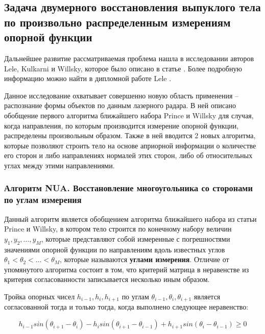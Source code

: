 \documentclass[a4paper, 12pt, titlepage]{article}
\theoremstyle{definition}
\theoremstyle{plain}
\theoremstyle{plain}
\begin{document}
\newpage
\subsection{Задача двумерного восстановления выпуклого тела по произвольно
распределенным измерениям опорной функции}
\label{sec:support-methods:2d-nonuniform}

Дальнейшее развитие рассматриваемая проблема нашла в исследовании авторов Lele,
Kulkarni и Willsky, которое было описано в статье
\cite{journals/josaa/LeleKW92}. Более подробную информацию можно найти в
дипломной работе Lele \cite{thesis/Lele90}.

Данное исследование охватывает совершенно новую область применения --
распознание формы объектов по данным лазерного радара. В ней описано обобщение
первого алгоритма ближайшего набора Prince и Willsky для случая, когда
направления, по которым производится измерение опорной функции, распределены
произвольным образом. Также в ней вводится 2 новых алгоритма, которые позволяют
строить тело на основе априорной информации о количестве его сторон и
либо направлениях нормалей этих сторон, либо об относительных углах между этими
направлениями.

\subsubsection{Алгоритм NUA. Восстановление многоугольника со сторонами по
углам измерения}
\label{sec:support-methods:2d-nonuniform:nua}

Данный алгоритм является обобщением алгоритма ближайшего набора из статьи Prince
и Willsky, в котором тело строится по конечному набору величин
$y_{1}, y_{2}, \ldots, y_{M}$,  которые представляют собой измеренные с
погрешностями значениями опорной функции по направлениям вдоль известных углов
$\theta_{1} < \theta_{2} < \ldots < \theta_{M}$, которые называются
\textbf{углами измерения}. Отличие от упомянутого алгоритма состоит в том, что
критерий матрица в неравенстве из критерия согласованности записывается
несколько иным образом.

Тройка опорных чисел $h_{i - 1}, h_{i}, h_{i + 1}$ по углам $\theta_{i - 1},
\theta_{i}, \theta_{i + 1}$ является согласованной тогда и только тогда, когда
выполнено следующее неравенство:

\begin{equation}
h_{i - 1} sin(\theta_{i + 1} - \theta_{i}) -
h_{i} sin(\theta_{i + 1} - \theta_{i - 1}) +
h_{i + 1} sin(\theta_{i} - \theta_{i - 1}) \geq 0
\end{equation}
\end{document}
